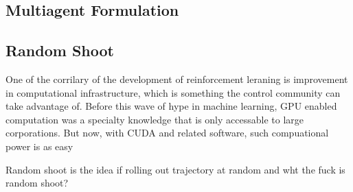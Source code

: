 \documentclass[journal]{IEEEtran}
\begin{document}
\subsection{Multiagent Formulation}



\subsection{Random Shoot}
One of the corrilary of the development of reinforcement leraning is improvement in computational infrastructure, which is something the control community can take advantage of. Before this wave of hype in machine learning, GPU enabled computation was a specialty knowledge that is only accessable to large corporations. But now, with CUDA and related software, such compuational power is as easy

Random shoot is the idea if rolling out trajectory at random and wht the fuck is random shoot?






\end{document}
